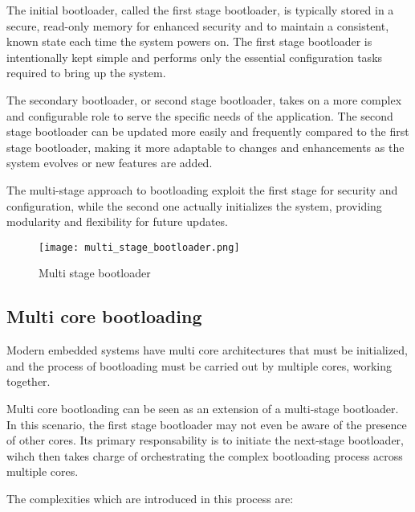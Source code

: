 The initial bootloader, called the first stage bootloader, is typically stored
in a secure, read-only memory for enhanced security and to maintain a
consistent, known state each time the system powers on.
The first stage bootloader is intentionally kept simple and performs only the
essential configuration tasks required to bring up the system.

The secondary bootloader, or second stage bootloader, takes on a more complex
and configurable role to serve the specific needs of the application.
The second stage bootloader can be updated more easily and frequently compared
to the first stage bootloader, making it more adaptable to changes and
enhancements as the system evolves or new features are added.

The multi-stage approach to bootloading exploit the first stage for security
and configuration, while the second one actually initializes the system,
providing modularity and flexibility for future updates.

\begin{figure}[ht]
    \centering
    \texttt{[image: multi\_stage\_bootloader.png]}
    \caption{Multi stage bootloader}
\end{figure}

\subsection{Multi core bootloading}

Modern embedded systems have multi core architectures that must be initialized,
and the process of bootloading must be carried out by multiple cores, working
together.

Multi core bootloading can be seen as an extension of a multi-stage bootloader.
In this scenario, the first stage bootloader may not even be aware of the
presence of other cores. Its primary responsability is to initiate the
next-stage bootloader, wihch then takes charge of orchestrating the complex
bootloading process across multiple cores.

The complexities which are introduced in this process are:

